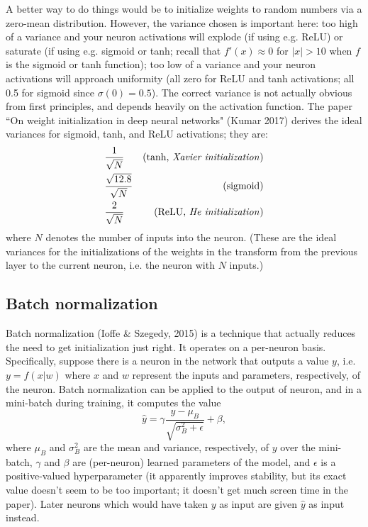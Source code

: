 A better way to do things would be to initialize weights to random numbers via a zero-mean distribution. However, the variance chosen is important here: too high of a variance and your neuron activations will explode (if using e.g. ReLU) or saturate (if using e.g. sigmoid or tanh; recall that $f'(x) \approx 0$ for $|x| > 10$ when $f$ is the sigmoid or tanh function); too low of a variance and your neuron activations will approach uniformity (all zero for ReLU and tanh activations; all 0.5 for sigmoid since $\sigma(0) = 0.5$). The correct variance is not actually obvious from first principles, and depends heavily on the activation function. The paper ``On weight initialization in deep neural networks" (Kumar 2017) derives the ideal variances for sigmoid, tanh, and ReLU activations; they are:
\begin{align*}
&\frac{1}{\sqrt{N}} &\text{(tanh, \emph{Xavier initialization})}\\
&\frac{\sqrt{12.8}}{\sqrt{N}} &\text{(sigmoid)}\\
&\frac{2}{\sqrt{N}} &\text{(ReLU, \emph{He initialization})}
\end{align*}
where $N$ denotes the number of inputs into the neuron. (These are the ideal variances for the initializations of the weights in the transform from the previous layer to the current neuron, i.e. the neuron with $N$ inputs.)

\subsection{Batch normalization}
Batch normalization (Ioffe \& Szegedy, 2015) is a technique that actually reduces the need to get initialization just right. It operates on a per-neuron basis. Specifically, suppose there is a neuron in the network that outputs a value $y$, i.e. $y = f(x | w)$ where $x$ and $w$ represent the inputs and parameters, respectively, of the neuron. Batch normalization can be applied to the output of neuron, and in a mini-batch during training, it computes the value
$$\hat{y} = \gamma \frac{y - \mu_B}{\sqrt{\sigma_B^2 + \epsilon}} + \beta,$$
where $\mu_B$ and $\sigma_B^2$ are the mean and variance, respectively, of $y$ over the mini-batch, $\gamma$ and $\beta$ are (per-neuron) learned parameters of the model, and $\epsilon$ is a positive-valued hyperparameter (it apparently improves stability, but its exact value doesn't seem to be too important; it doesn't get much screen time in the paper). Later neurons which would have taken $y$ as input are given $\hat{y}$ as input instead. 

